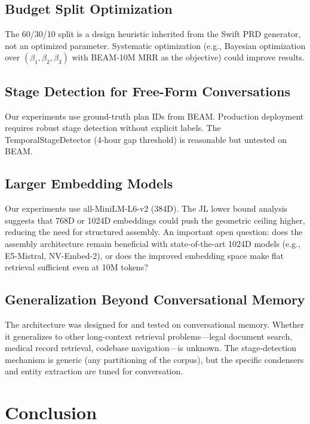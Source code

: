\documentclass[11pt]{article}
\newcommand{\eg}{e.g.}
\begin{document}
\subsection{Budget Split Optimization}

The 60/30/10 split is a design heuristic inherited from the Swift PRD
generator, not an optimized parameter.  Systematic optimization (\eg,
Bayesian optimization over $(\beta_1, \beta_2, \beta_3)$ with
BEAM-10M MRR as the objective) could improve results.

\subsection{Stage Detection for Free-Form Conversations}

Our experiments use ground-truth plan IDs from BEAM.  Production
deployment requires robust stage detection without explicit labels.
The TemporalStageDetector (4-hour gap threshold) is reasonable but
untested on BEAM.

\subsection{Larger Embedding Models}

Our experiments use all-MiniLM-L6-v2 (384D).  The JL lower bound
analysis suggests that 768D or 1024D embeddings could push the
geometric ceiling higher, reducing the need for structured assembly.
An important open question: does the assembly architecture remain
beneficial with state-of-the-art 1024D models (\eg, E5-Mistral,
NV-Embed-2), or does the improved embedding space make flat retrieval
sufficient even at 10M tokens?

\subsection{Generalization Beyond Conversational Memory}

The architecture was designed for and tested on conversational memory.
Whether it generalizes to other long-context retrieval
problems---legal document search, medical record retrieval, codebase
navigation---is unknown.  The stage-detection mechanism is generic
(any partitioning of the corpus), but the specific condensers and
entity extraction are tuned for conversation.

\section{Conclusion}
\label{sec:conclusion}
\end{document}
